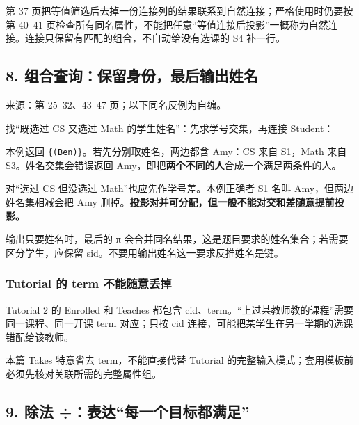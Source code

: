 第 37 页把等值筛选后去掉一份连接列的结果联系到自然连接；严格使用时仍要按第 40--41 页检查所有同名属性，不能把任意``等值连接后投影''一概称为自然连接。连接只保留有匹配的组合，不自动给没有选课的 S4 补一行。

\subsection{8. 组合查询：保留身份，最后输出姓名}\label{05_relational_algebra_zh-ux7ec4ux5408ux67e5ux8be2ux4fddux7559ux8eabux4efdux6700ux540eux8f93ux51faux59d3ux540d}

来源：第 25--32、43--47 页；以下同名反例为自编。

找``既选过 CS 又选过 Math 的学生姓名''：先求学号交集，再连接 Student：


本例返回 \texttt{\{(Ben)\}}。若先分别取姓名，两边都含 Amy：CS 来自 S1，Math 来自 S3。姓名交集会错误返回 Amy，即把\textbf{两个不同的人}合成一个满足两条件的人。

对``选过 CS 但没选过 Math''也应先作学号差。本例正确者 S1 名叫 Amy，但两边姓名集相减会把 Amy 删掉。\textbf{投影对并可分配，但一般不能对交和差随意提前投影。}

输出只要姓名时，最后的 π 会合并同名结果，这是题目要求的姓名集合；若需要区分学生，应保留 sid。不要用输出姓名这一要求反推姓名是键。

\subsubsection{Tutorial 的 term 不能随意丢掉}\label{05_relational_algebra_zh-tutorial-ux7684-term-ux4e0dux80fdux968fux610fux4e22ux6389}

Tutorial 2 的 Enrolled 和 Teaches 都包含 cid、term。``上过某教师教的课程''需要同一课程、同一开课 term 对应；只按 cid 连接，可能把某学生在另一学期的选课错配给该教师。

本篇 Takes 特意省去 term，不能直接代替 Tutorial 的完整输入模式；套用模板前必须先核对关联所需的完整属性组。

\Needspace{11cm}
\subsection{9. 除法 ÷：表达``每一个目标都满足''}\label{05_relational_algebra_zh-ux9664ux6cd5-ux8868ux8fbeux6bcfux4e00ux4e2aux76eeux6807ux90fdux6ee1ux8db3}

